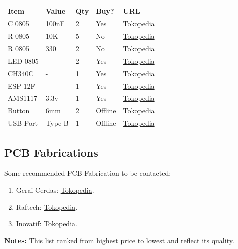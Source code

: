 \documentclass[a4paper,12pt,oneside,pdflatex,italian,final,twocolumn]{article}
\begin{document}
	\begin{table}[!ht]
		\centering
		\begin{tabular}{|l|l|l|l|l|}
			\hline
			Item & Value & Qty & Buy? & URL \\
			\hline
			C 0805 & 100nF & 2 & Yes & \href{https://www.tokopedia.com/ndtechnology/kapasitor-capacitor-smd-0805-100nf-bijian-pcs}{Tokopedia} \\
			R 0805 & 10K & 5 & No & \href{https://www.tokopedia.com/wiksatech/resistor-10k-5-0805-284b}{Tokopedia} \\
			R 0805 & 330 & 2 & No & \href{https://www.tokopedia.com/isee/resistor-smd-0805-330ohm-330-ohm-toleransi-1-tolerance-1}{Tokopedia} \\
			LED 0805 & - & 2 & Yes & \href{https://www.tokopedia.com/wkh-elektronik/led-smd-0805-white-color-warna-putih-smt}{Tokopedia} \\
			CH340C & - & 1 & Yes & \href{https://www.tokopedia.com/celectro/ic-ch340c-smd}{Tokopedia} \\
			ESP-12F & - & 1 & Yes & \href{https://www.tokopedia.com/cncstorebandung/cnc-esp8266-esp-12f-esp12f-esp-12-esp12-wifi-serial-transceiver}{Tokopedia} \\
			AMS1117 & 3.3v & 1 & Yes & \href{https://www.tokopedia.com/isee/ams1117-3-3v-smd-regulator-sot-223}{Tokopedia} \\
			Button & 6mm & 2 & Offline & \href{https://www.tokopedia.com/eltech-online/6x6x5h-height-tinggi-5mm-tact-switch-saklar-omten-ts-6650}{Tokopedia} \\
			USB Port & Type-B & 1 & Offline & \href{https://www.tokopedia.com/eltech-online/usb-b-pcb-female-right-angle-siku-bengkok}{Tokopedia} \\
			\hline
		\end{tabular}
	\end{table}

	\subsection{PCB Fabrications}

	Some recommended PCB Fabrication to be contacted:
	\begin{enumerate}
		\item Gerai Cerdas: \href{https://www.tokopedia.com/geraicerdas/cetak-pcb-1-keping-single-double-layer-rapid-prototyping-satuan}{Tokopedia}.

		\item Raftech: \href{https://www.tokopedia.com/raftech/jasa-cetak-pcb-double-layer-fr4-full-masking-jalur-masking-silkscreen}{Tokopedia}.

		\item Inovatif: \href{https://www.tokopedia.com/inovatif/cetak-pcb-satuan-dan-desain-pcb-masking}{Tokopedia}.
	\end{enumerate}

	\textbf{Notes:} This list ranked from highest price to lowest and reflect its quality.
\end{document}
